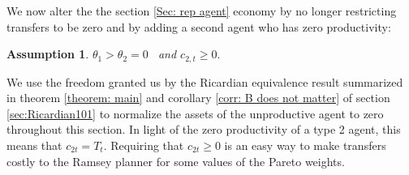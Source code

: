 \documentclass[thmsb,11pt]{article}
\newtheorem{assumption}{Assumption}
\begin{document}
 We now alter the
the section \ref{Sec: rep agent} %
 economy by no longer restricting transfers to be zero  and by adding
  a second agent who has zero productivity:
\begin{assumption}
 $\theta_1>\theta_2=0$ \ {\rm  and} $c_{2,t}\geq 0.$
\end{assumption}
We use the freedom granted us by the Ricardian equivalence result summarized in theorem \ref{theorem: main} and corollary \ref{corr: B does not matter}
of  section \ref{sec:Ricardian101} to  normalize the assets of the unproductive agent to zero throughout this section.  In light of the zero productivity of a type 2 agent,
 this means that  $c_{2t} = T_t$.
Requiring that $c_{2t} \geq 0$ is  an easy way to make transfers  costly
to the Ramsey planner for some values of the Pareto weights.

\end{document}
